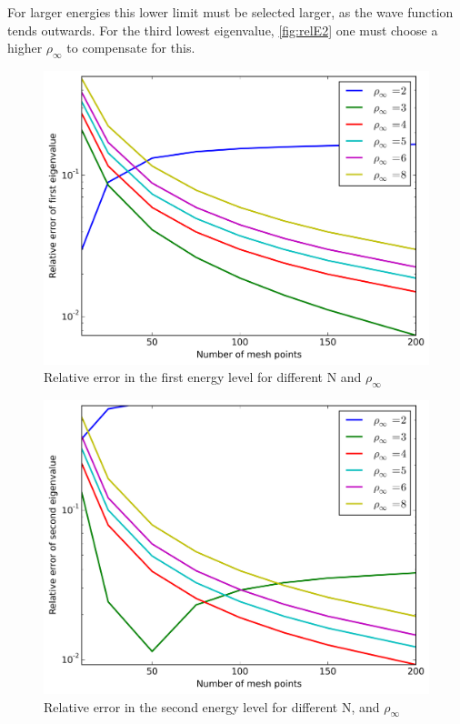 \documentclass[11pt,a4paper,english,final]{article}
\numberwithin{equation}{section}
\newcommand{\figurewidth}{.85\textwidth}
\begin{document}
For larger energies this lower limit must be selected larger, as the 
wave function tends outwards. For the third lowest eigenvalue, 
\ref{fig:relE2} one must choose a higher $\rho_\infty$ to compensate 
for this.


\begin{figure}
\centering
\includegraphics[width=\figurewidth]{../results/rel_logE0.png}
\caption{Relative error in the first energy level for 
different N and $\rho_\infty$}
\label{fig:relE0}
\end{figure}

\begin{figure}
\centering
\includegraphics[width=\figurewidth]{../results/rel_logE1.png}
\caption{Relative error in the second energy level for different N,
and $\rho_\infty$}
\label{fig:relE1}
\end{figure}
\end{document}
